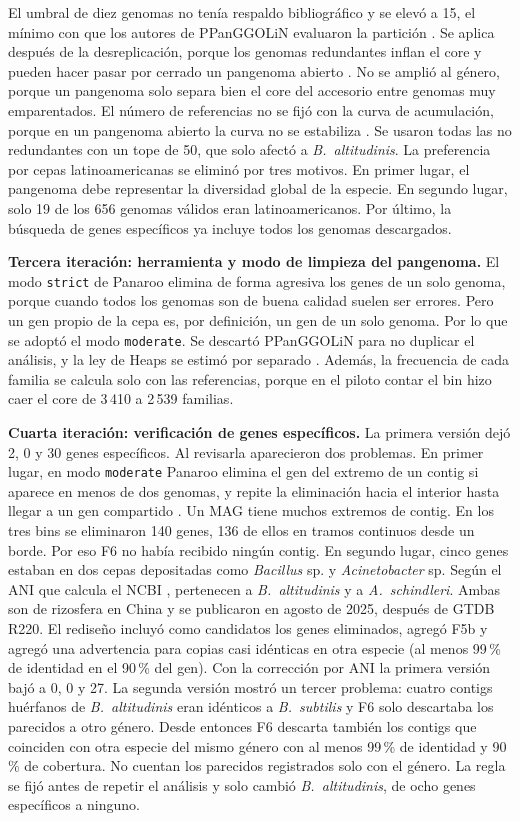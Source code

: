 El umbral de diez genomas no tenía respaldo bibliográfico y se elevó a 15, el
mínimo con que los autores de PPanGGOLiN evaluaron la partición
\cite{ppanggolin2020}. Se aplica después de la desreplicación, porque los
genomas redundantes inflan el core y pueden hacer pasar por cerrado un pangenoma
abierto \cite{guerra2026}. No se amplió al género, porque un pangenoma solo
separa bien el core del accesorio entre genomas muy emparentados. El número de
referencias no se fijó con la curva de acumulación, porque en un pangenoma
abierto la curva no se estabiliza \cite{tettelin2008}. Se usaron todas las no
redundantes con un tope de 50, que solo afectó a \textit{B.~altitudinis}. La
preferencia por cepas latinoamericanas se eliminó por tres motivos. En primer
lugar, el pangenoma debe representar la diversidad global de la especie. En
segundo lugar, solo 19 de los 656 genomas válidos eran latinoamericanos. Por
último, la búsqueda de genes específicos ya incluye todos los genomas
descargados.

\textbf{Tercera iteración: herramienta y modo de limpieza del pangenoma.} El
modo \texttt{strict} de Panaroo elimina de forma agresiva los genes de un solo
genoma, porque cuando todos los genomas son de buena calidad suelen ser errores.
Pero un gen propio de la cepa es, por definición, un gen de un solo genoma. Por
lo que se adoptó el modo \texttt{moderate}. Se descartó PPanGGOLiN para no
duplicar el análisis, y la ley de Heaps se estimó por separado
\cite{snipen2015}. Además, la frecuencia de cada familia se calcula solo con las
referencias, porque en el piloto contar el bin hizo caer el core de 3\,410 a
2\,539 familias.

\textbf{Cuarta iteración: verificación de genes específicos.} La primera
versión dejó 2, 0 y 30 genes específicos. Al revisarla aparecieron dos
problemas. En primer lugar, en modo \texttt{moderate} Panaroo elimina el gen del
extremo de un contig si aparece en menos de dos genomas, y repite la eliminación
hacia el interior hasta llegar a un gen compartido \cite{panaroo2020}. Un MAG
tiene muchos extremos de contig. En los tres bins se eliminaron 140 genes, 136
de ellos en tramos continuos desde un borde. Por eso F6 no había recibido
ningún contig. En segundo lugar, cinco genes estaban en dos cepas depositadas
como \textit{Bacillus} sp. y \textit{Acinetobacter} sp. Según el ANI que calcula
el NCBI \cite{ciufo2018}, pertenecen a \textit{B.~altitudinis} y a
\textit{A.~schindleri}. Ambas son de rizosfera en China y se publicaron en
agosto de 2025, después de GTDB R220. El rediseño incluyó como candidatos los
genes eliminados, agregó F5b y agregó una advertencia para copias casi idénticas
en otra especie (al menos 99\,\% de identidad en el 90\,\% del gen). Con la
corrección por ANI la primera versión bajó a 0, 0 y 27. La segunda versión
mostró un tercer problema: cuatro contigs huérfanos de \textit{B.~altitudinis}
eran idénticos a \textit{B.~subtilis} y F6 solo descartaba los parecidos a otro
género. Desde entonces F6 descarta también los contigs que coinciden con otra
especie del mismo género con al menos 99\,\% de identidad y 90\,\% de
cobertura. No cuentan los parecidos registrados solo con el género. La regla se
fijó antes de repetir el análisis y solo cambió \textit{B.~altitudinis}, de ocho
genes específicos a ninguno.

